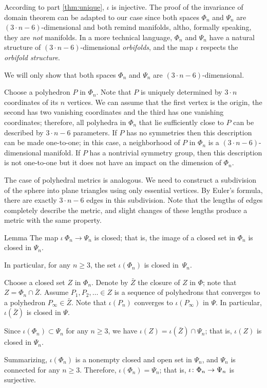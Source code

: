 \documentclass[oneside,a4paper]{article}
\begin{document}
According to part \ref{thm:unique}, $\iota$ is injective.
The proof of the invariance of domain theorem can be adapted to our case since both spaces $\Phi_n$ and $\Psi_n$ are $(3\cdot n-6)$-dimensional and both remind manifolds, altho, formally speaking, they are \emph{not} manifolds.
In a more technical language, $\Phi_n$ and $\Psi_n$ have a natural structure of $(3\cdot n-6)$-dimensional \emph{orbifolds},
and the map $\iota$ respects the \emph{orbifold structure}.

We will only show that both spaces $\Phi_n$ and $\Psi_n$ are $(3\cdot n-6)$-dimensional.

Choose a polyhedron $P$ in $\Phi_n$.
Note that $P$ is uniquely determined by $3\cdot n$ coordinates of its $n$ vertices.
We can assume that the first vertex is the origin, the second has two vanishing coordinates and the third has one vanishing coordinates; therefore, all polyhedra in $\Phi_n$ that lie sufficiently close to $P$ can be described by $3\cdot n-6$ parameters.
If $P$ has no symmetries then this description can be made one-to-one;
in this case, a neighborhood of $P$ in $\Phi_n$ is a $(3\cdot n-6)$-dimensional manifold.
If $P$ has a nontrivial symmetry group, then this description is not one-to-one but it does not have an impact on the dimension of $\Phi_n$.

The case of polyhedral metrics is analogous.
We need to construct a subdivision of the sphere into plane triangles using only essential vertices.
By Euler's formula, there are exactly $3\cdot n-6$ edges in this subdivision.
Note that the lengths of edges completely describe the metric, and slight changes of these lengths produce a metric with the same property.

\begin{thm}{Lemma}
The map $\iota\:\Phi_n\to\Psi_n$ is closed;
that is, the image of a closed set in $\Phi_n$ is closed in $\Psi_n$.

In particular, for any $n\ge 3$, the set $\iota(\Phi_n)$ is closed in~$\Psi_n$.
\end{thm}

Choose a closed set $Z$ in $\Phi_n$.
Denote by $\bar Z$ the closure of $Z$ in $\Phi$; note that $Z=\Phi_n\cap \bar Z$.
Assume $P_1,P_2,\dots\in Z$ is a sequence of polyhedrons that converges to a polyhedron $P_\infty\in\bar Z$.
Note that $\iota(P_n)$ converges to $\iota(P_\infty)$ in $\Psi$.
In particular, $\iota(\bar Z)$ is closed in $\Psi$.

Since $\iota(\Phi_n)\subset \Psi_n$ for any $n\ge 3$, we have  $\iota (Z)=\iota(\bar Z)\cap \Psi_n$;
that is, $\iota (Z)$ is closed in $\Psi_n$. 

\medskip

Summarizing, $\iota(\Phi_n)$ is a nonempty closed and open set in $\Psi_n$, and $\Psi_n$ is connected for any $n\ge 3$.
Therefore, $\iota(\Phi_n)=\Psi_n$; that is, $\iota\:\Phi_n\z\to\Psi_n$ is surjective.
\qeds

\sloppy
\printbibliography[heading=bibintoc]
\fussy
\end{document}
